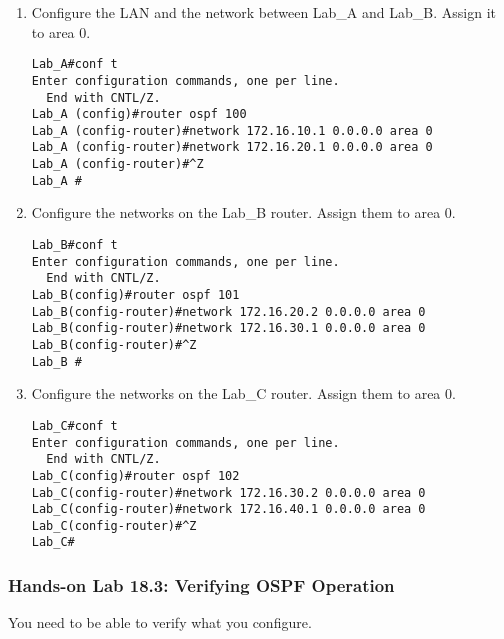 \begin{enumerate}
\item
  Configure the LAN and the network between Lab\_A and Lab\_B. Assign it
  to area 0.

\begin{verbatim}
Lab_A#conf t
Enter configuration commands, one per line.
  End with CNTL/Z.
Lab_A (config)#router ospf 100
Lab_A (config-router)#network 172.16.10.1 0.0.0.0 area 0
Lab_A (config-router)#network 172.16.20.1 0.0.0.0 area 0
Lab_A (config-router)#^Z
Lab_A #
\end{verbatim}
\item
  Configure the networks on the Lab\_B router. Assign them to area 0.

\begin{verbatim}
Lab_B#conf t
Enter configuration commands, one per line.
  End with CNTL/Z.
Lab_B(config)#router ospf 101
Lab_B(config-router)#network 172.16.20.2 0.0.0.0 area 0
Lab_B(config-router)#network 172.16.30.1 0.0.0.0 area 0
Lab_B(config-router)#^Z
Lab_B #
\end{verbatim}
\item
  Configure the networks on the Lab\_C router. Assign them to area 0.

\begin{verbatim}
Lab_C#conf t
Enter configuration commands, one per line.
  End with CNTL/Z.
Lab_C(config)#router ospf 102
Lab_C(config-router)#network 172.16.30.2 0.0.0.0 area 0
Lab_C(config-router)#network 172.16.40.1 0.0.0.0 area 0
Lab_C(config-router)#^Z
Lab_C#
\end{verbatim}
\end{enumerate}

\subsubsection[Hands-on Lab 18.3: Verifying OSPF
Operation]{\texorpdfstring{\protect\hypertarget{c18.xhtmlux5cux23c18-sec-23}{}{}Hands-on
Lab 18.3: Verifying OSPF
Operation}{Hands-on Lab 18.3: Verifying OSPF Operation}}

You need to be able to verify what you configure.

